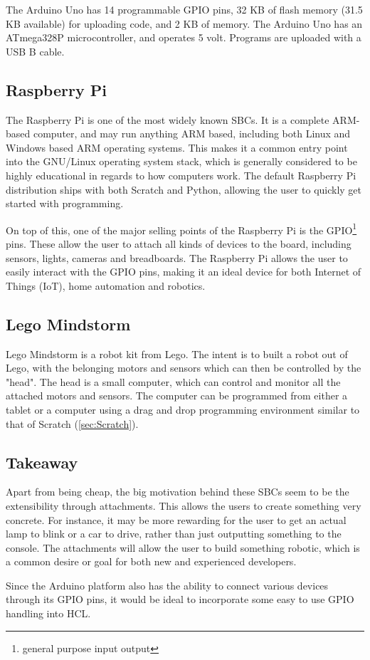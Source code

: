 The Arduino Uno has 14 programmable GPIO pins, 32 KB of flash memory (31.5 KB available) for uploading code, and 2 KB of memory.
The Arduino Uno has an ATmega328P microcontroller, and operates 5 volt.
Programs are uploaded with a USB B cable.

\subsection{Raspberry Pi}
The Raspberry Pi is one of the most widely known SBCs. 
It is a complete ARM-based computer, and may run anything ARM based, including both Linux and Windows based ARM operating systems. 
This makes it a common entry point into the GNU/Linux operating system stack, which is generally considered to be highly educational in regards to how computers work.
The default Raspberry Pi distribution ships with both Scratch and Python, allowing the user to quickly get started with programming\cite{RaspberryPi}.

On top of this, one of the major selling points of the Raspberry Pi is the GPIO\footnote{general purpose input output} pins. 
These allow the user to attach all kinds of devices to the board, including sensors, lights, cameras and breadboards. 
The Raspberry Pi allows the user to easily interact with the GPIO pins, making it an ideal device for both Internet of Things (IoT), home automation and robotics\cite{RaspberryPi}.

\subsection{Lego Mindstorm}
Lego Mindstorm is a robot kit from Lego. 
The intent is to built a robot out of Lego, with the belonging motors and sensors which can then be controlled by the "head". 
The head is a small computer, which can control and monitor all the attached motors and sensors. 
The computer can be programmed from either a tablet or a computer using a drag and drop programming environment similar to that of Scratch (\ref{sec:Scratch})\cite{LegoMindstorms}.

\subsection{Takeaway}
Apart from being cheap, the big motivation behind these SBCs seem to be the extensibility through attachments. 
This allows the users to create something very concrete. 
For instance, it may be more rewarding for the user to get an actual lamp to blink or a car to drive, rather than just outputting something to the console. 
The attachments will allow the user to build something robotic, which is a common desire or goal for both new and experienced developers\cite{EducationalRobotics}.

Since the Arduino platform also has the ability to connect various devices through its GPIO pins, it would be ideal to incorporate some easy to use GPIO handling into HCL.
